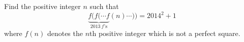Find the positive integer $n$ such that \[ \underbrace{f(f(\cdots f}_{2013 \ f\text{'s}}(n)\cdots ))=2014^2+1 \] where $f(n)$ denotes the $n$th positive integer which is not a perfect square.
